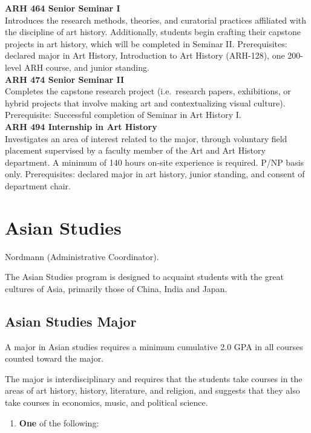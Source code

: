 \documentclass[
  letterpaper,
]{scrbook}
\providecommand{\tightlist}{%
  \setlength{\itemsep}{0pt}\setlength{\parskip}{0pt}}
\begin{document}
\textbf{ARH 464 Senior Seminar I}\\
Introduces the research methods, theories, and curatorial practices
affiliated with the discipline of art history. Additionally, students
begin crafting their capstone projects in art history, which will be
completed in Seminar II. Prerequisites: declared major in Art History,
Introduction to Art History (ARH-128), one 200-level ARH course, and
junior standing.\\
\textbf{ARH 474 Senior Seminar II}\\
Completes the capstone research project (i.e.~research papers,
exhibitions, or hybrid projects that involve making art and
contextualizing visual culture). Prerequisite: Successful completion of
Seminar in Art History I.\\
\textbf{ARH 494 Internship in Art History}\\
Investigates an area of interest related to the major, through voluntary
field placement supervised by a faculty member of the Art and Art
History department. A minimum of 140 hours on-site experience is
required. P/NP basis only. Prerequisites: declared major in art history,
junior standing, and consent of department chair.

\section{Asian Studies}\label{sec-asian-studies}

Nordmann (Administrative Coordinator).

The Asian Studies program is designed to acquaint students with the
great cultures of Asia, primarily those of China, India and Japan.

\subsection{Asian Studies Major}\label{asian-studies-major}

A major in Asian studies requires a minimum cumulative 2.0 GPA in all
courses counted toward the major.

The major is interdisciplinary and requires that the students take
courses in the areas of art history, history, literature, and religion,
and suggests that they also take courses in economics, music, and
political science.

\begin{enumerate}
\def\labelenumi{\arabic{enumi}.}
\tightlist
\item
  \textbf{One} of the following:
\end{enumerate}
\end{document}
